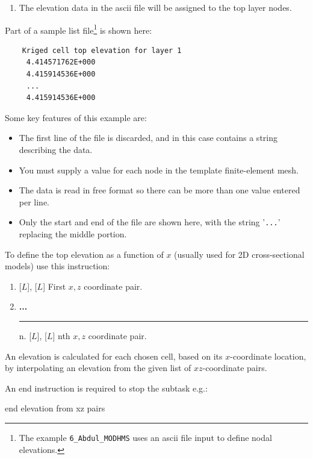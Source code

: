     {\squish
    \begin{enumerate}
    \item {}  The elevation data in the ascii file  will be assigned to the top layer nodes.
    \end{enumerate}
    }

Part of a sample list file\footnote{The example \texttt{6\_Abdul\_MODHMS} uses an ascii file input to define nodal elevations.} is shown here:
    \begin{verbatim}
    Kriged cell top elevation for layer 1
     4.414571762E+000
     4.415914536E+000
     ...
     4.415914536E+000
     \end{verbatim}
     \squish
Some key features of this example are:
\begin{itemize}
  \item The first line of the file is discarded, and in this case contains a string describing the data.
  \item You must supply a value for each node in the template finite-element mesh.
  \item The data is read in free format so there can be more than one value entered per line.
  \item Only the start and end of the file are shown here, with the string '\texttt{...}' replacing the middle portion.
\end{itemize}

To define the top elevation as a function of $x$ (usually used for 2D cross-sectional models) use this instruction:

    {
    \squish
    \begin{enumerate}
    \item {} [$L$],  [$L$]  First $x, z$ coordinate pair.
    \item \textbf{...} \\
     \hspace*{-.27in}\rule{0.in}{.24in}  n.  [$L$],  [$L$]  nth $x, z$ coordinate pair.
    \end{enumerate}

     An elevation is calculated for each chosen cell, based on its $x$-coordinate location, by interpolating an elevation from the given list of  $xz$-coordinate pairs.

    An end instruction is required to stop the subtask e.g.:

    {\Large \sf end elevation from xz pairs}
    }


